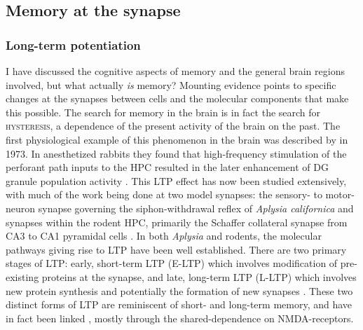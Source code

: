 
\subsection{Memory at the synapse}

\subsubsection{Long-term potentiation}
\label{sec:intro:memory:LTP}
I have discussed the cognitive aspects of memory and the general brain regions involved, but what actually \textit{is} memory?
Mounting evidence points to specific changes at the synapses between cells and the molecular components that make this possible.
The search for memory in the brain is in fact the search for \textsc{hysteresis}, a dependence of the present activity of the brain on the past.
The first physiological example of this phenomenon in the brain was described by \citeauthor{Bliss1973} in 1973.
In anesthetized rabbits they found that high-frequency stimulation of the perforant path inputs to the \ac{HPC} resulted in the later enhancement of \ac{DG} granule population activity \citep{Bliss1973}.
This \ac{LTP} effect has now been studied extensively, with much of the work being done at two model synapses: the sensory- to motor-neuron synapse governing the siphon-withdrawal reflex of \emph{Aplysia californica} and synapses within the rodent \ac{HPC}, primarily the Schaffer collateral synapse from CA3 to CA1 pyramidal cells \citep{Kandel2001, Bailey2008}.
In both \emph{Aplysia} and rodents, the molecular pathways giving rise to \ac{LTP} have been well established.
There are two primary stages of \ac{LTP}: early, short-term LTP (E-LTP) which involves modification of pre-existing proteins at the synapse, and late, long-term LTP (L-LTP) which involves new protein synthesis and potentially the formation of new synapses \citep{Frey1988, Bailey2008}.
These two distinct forms of LTP are reminiscent of short- and long-term memory, and have in fact been linked \citep{Moser1998a, Hernandez2008}, mostly through the shared-dependence on NMDA-receptors.

